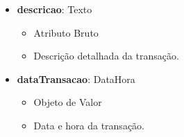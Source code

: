 \begin{itemize}
        \item \textbf{descricao}: Texto  
              \begin{itemize}
                  \item Atributo Bruto
                  \item Descrição detalhada da transação.
              \end{itemize}
    
        \item \textbf{dataTransacao}: DataHora  
              \begin{itemize}
                  \item Objeto de Valor
                  \item Data e hora da transação.
              \end{itemize}
    \end{itemize}
    
